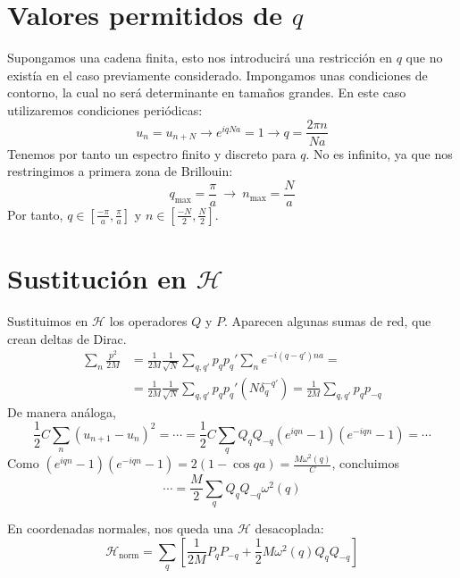 \section*{Valores permitidos de $q$}
Supongamos una cadena finita, esto nos introducirá una restricción en
$q$ que no existía en el caso previamente considerado. Impongamos unas condiciones de
contorno, la cual no será determinante en tamaños grandes. En este
caso utilizaremos condiciones periódicas:
\begin{equation}
  u_n = u_{n+N} \rightarrow e^{iqNa} = 1 \rightarrow \boxed{ q =
    \frac{2\pi n}{Na}}
\end{equation}
Tenemos por tanto un espectro finito y discreto para $q$.
No es infinito, ya que nos restringimos a primera zona de Brillouin:
\begin{equation}
  q_{\text{max}} = \frac{\pi}{a} \ \rightarrow \ n_{\text{max}}  = \frac{N}{a}
\end{equation}
Por tanto, $q \in \left[\frac{-\pi}{a}, \frac{\pi}{a}\right]$ y $n \in
\left[\frac{-N}{2}, \frac{N}{2}\right]$.

\section*{Sustitución en $\mathcal{H}$}
Sustituimos en $\mathcal{H}$ los operadores $Q$ y $P$. Aparecen
algunas sumas de red, que crean deltas de Dirac.
\begin{equation}
\begin{split}
  \sum_n \frac{p^2}{2M} &= \frac{1}{2M}  \frac{1}{\sqrt
    N}\sum_{q,q'}^{ } p_q p_q' \sum_{n}^{ } e^{-i(q-q')na} =\\ &= \frac{1}{2M}  \frac{1}{\sqrt
    N}\sum_{q,q'}^{ } p_q p_q' ( N\delta_q^{-q'} ) = \frac{1}{2M} \sum_{q,q'}^{ } p_q p_{-q}
\end{split}
\end{equation}
De manera análoga,
\begin{equation}
  \frac{1}{2} C \sum_{n}^{ } (u_{n+1} - u_n)^2 = \cdots = \frac{1}{2}
  C \sum_{q}^{ } Q_q Q_{-q} (e^{iqn} - 1) (e^{-iqn} - 1) = \cdots
\end{equation}
Como $(e^{iqn} - 1) (e^{-iqn} - 1) = 2 (1 - \cos qa) = \frac{M
  \omega^2 (q)}{C}$, concluimos
\begin{equation}
  \cdots = \frac{M}{2} \sum_q Q_q Q_{-q} \omega^2 (q)
\end{equation}

En coordenadas normales, nos queda una $\mathcal{H}$ desacoplada:
\begin{equation}
  \boxed{
    \mathcal{H}_{\text{norm}} = \sum_{q}^{ } \left[ \frac{1}{2M} P_q
      P_{-q} + \frac{1}{2} M \omega^2 (q) Q_q Q_{-q} \right]
}
\end{equation}

